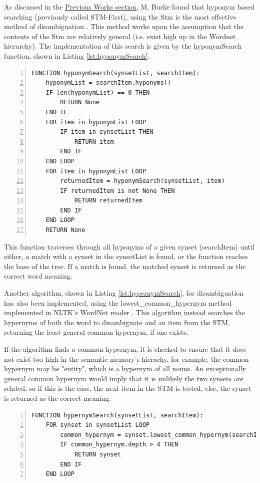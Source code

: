 \documentclass[]{article}
\begin{document}
As discussed in the \hyperref[sec:MattBurke]{Previous Works section}, M. Burke found that hyponym based searching (previously called STM-First), using the Stm is the most effective method of disambiguation \cite{MattBurkePrevious}. This method works upon the assumption that the contents of the Stm are relatively general (i.e. exist high up in the Wordnet hierarchy). The implementation of this search is given by the hyponymSearch function, shown in Listing \ref{lst:hyponymSearch}.

\begin{lstlisting}[numbers=left, numberstyle=\small, caption={The hyponymSearch function}, captionpos=b, label={lst:hyponymSearch}]
FUNCTION hyponymSearch(synsetList, searchItem):
    hyponymList = searchItem.hyponyms()
    IF len(hyponymList) == 0 THEN
        RETURN None
    END IF
    FOR item in hyponymList LOOP
        IF item in synsetList THEN
            RETURN item
        END IF
    END LOOP
    FOR item in hyponymList LOOP
        returnedItem = hyponymSearch(synsetList, item)
        IF returnedItem is not None THEN
            RETURN returnedItem
        END IF
    END LOOP
    RETURN None
\end{lstlisting}

This function traverses through all hyponyms of a given synset (searchItem) until either, a match with a synset in the synsetList is found, or the function reaches the base of the tree. If a match is found, the matched synset is returned as the correct word meaning.

Another algorithm, shown in Listing \ref{lst:hypernymSearch}, for disambiguation has also been implemented, using the lowest{\_}common{\_}hypernym method implemented in NLTK's WordNet reader \cite{NLTK}. This algorithm instead searches the hypernyms of both the word to disambiguate and an item from the STM, returning the least general common hypernym, if one exists. 

If the algorithm finds a common hypernym, it is checked to ensure that it does not exist too high in the semantic memory's hierachy, for example, the common hypernym may be "entity", which is a hypernym of all nouns. An exceptionally general common hypernym would imply that it is unlikely the two synsets are related, so if this is the case, the next item in the STM is tested, else, the synset is returned as the correct meaning.

\begin{lstlisting}[numbers=left, numberstyle=\small, caption={THE HYPERNYMSEARCH FUNCTION}, captionpos=b, label={lst:hypernymSearch}]
FUNCTION hypernymSearch(synsetList, searchItem):
    FOR synset in synsetList LOOP
        common_hypernym = synset.lowest_common_hypernym(searchItem)
        IF common_hypernym.depth > 4 THEN
            RETURN synset
       	END IF
   	END LOOP
\end{lstlisting}  
\end{document}
